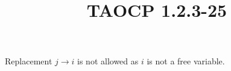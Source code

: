 \documentclass{article}
\title{TAOCP 1.2.3\mbox{-}25}
\begin{document}
\maketitle

Replacement \( j \to i \) is not allowed as \( i \) is not a free variable.
\end{document}
